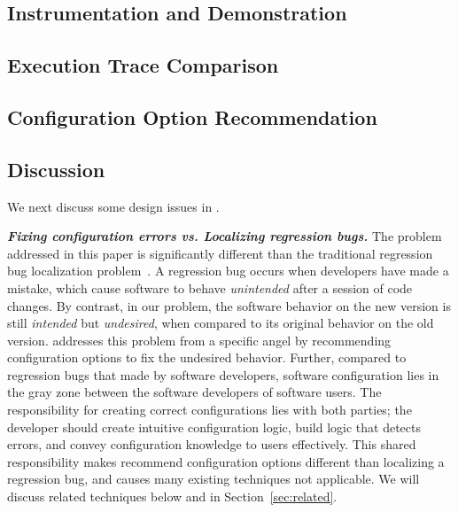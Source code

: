 \subsection{Instrumentation and Demonstration}
\label{sec:profiling}



\subsection{Execution Trace Comparison}
\label{sec:comparison}



\subsection{Configuration Option Recommendation}
\label{sec:rootcause}



\subsection{Discussion}
\label{sec:tech_discuss}

We next discuss some design issues in \ourtool.

\vspace{1mm}

\noindent \textbf{\textit{Fixing configuration errors 
vs. Localizing regression bugs.}}
The problem addressed in this paper is significantly different
than the traditional regression bug localization problem~\cite{}.
A regression bug occurs when developers have made a mistake,
which cause software to behave \textit{unintended} after a session of code changes.
By contrast, in our problem, the software behavior on the new version
is still \textit{intended} but \textit{undesired}, when compared
to its original behavior on the old version. \ourtool addresses
this problem from a specific angel by recommending configuration options
to fix the undesired behavior. Further, compared to
regression bugs that made by software developers,
software configuration lies in the gray zone between
the software developers of software users. The responsibility for creating
correct configurations lies with both parties; the developer should create
intuitive configuration logic, build logic that detects
errors, and convey configuration knowledge to users
effectively. This shared responsibility makes recommend configuration options
different than localizing a regression bug, and causes many existing
techniques not applicable. We will discuss related techniques below
and in Section~\ref{sec:related}.


